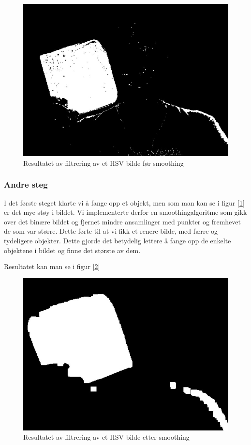 \begin{figure}[h!]
	\centering
	\includegraphics[scale=0.45]{img/first-binary.jpg}
	\caption[Første iterasjon binært bilde]{Resultatet av filtrering av et HSV bilde før smoothing}
	\label{fig:firstiterationbinary}
\end{figure}

\subsubsection{Andre steg}

I det første steget klarte vi å fange opp et objekt, men som man kan se i figur [\ref{fig:firstiterationbinary}] er det mye støy i bildet. Vi implementerte derfor en smoothingalgoritme som gikk over det binære bildet og fjernet mindre ansamlinger med punkter og fremhevet de som var større. Dette førte til at vi fikk et renere bilde, med færre og tydeligere objekter. Dette gjorde det betydelig lettere å fange opp de enkelte objektene i bildet og finne det største av dem.

Resultatet kan man se i figur [\ref{fig:seconditerationbinary}] 

\begin{figure}[h!]
	\centering
	\includegraphics[scale=0.45]{img/second-binary.jpg}
	\caption[Andre iterasjon binært bilde]{Resultatet av filtrering av et HSV bilde etter smoothing}
	\label{fig:seconditerationbinary}
\end{figure}

